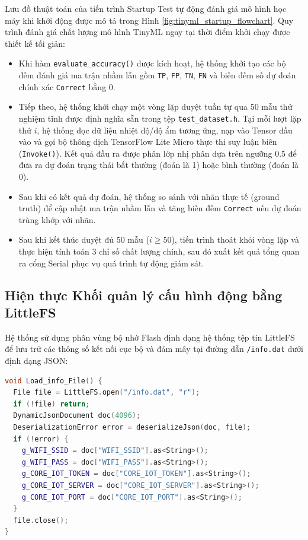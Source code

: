 Lưu đồ thuật toán của tiến trình Startup Test tự động đánh giá mô hình học máy khi khởi động được mô tả trong Hình \ref{fig:tinyml_startup_flowchart}. Quy trình đánh giá chất lượng mô hình TinyML ngay tại thời điểm khởi chạy được thiết kế tối giản:
\begin{itemize}
    \item Khi hàm \texttt{evaluate\_accuracy()} được kích hoạt, hệ thống khởi tạo các bộ đếm đánh giá ma trận nhầm lẫn gồm \texttt{TP}, \texttt{FP}, \texttt{TN}, \texttt{FN} và biến đếm số dự đoán chính xác \texttt{Correct} bằng 0.
    \item Tiếp theo, hệ thống khởi chạy một vòng lặp duyệt tuần tự qua 50 mẫu thử nghiệm tĩnh được định nghĩa sẵn trong tệp \texttt{test\_dataset.h}. Tại mỗi lượt lặp thứ $i$, hệ thống đọc dữ liệu nhiệt độ/độ ẩm tương ứng, nạp vào Tensor đầu vào và gọi bộ thông dịch TensorFlow Lite Micro thực thi suy luận biên (\texttt{Invoke()}). Kết quả đầu ra được phân lớp nhị phân dựa trên ngưỡng 0.5 để đưa ra dự đoán trạng thái bất thường (đoán là 1) hoặc bình thường (đoán là 0).
    \item Sau khi có kết quả dự đoán, hệ thống so sánh với nhãn thực tế (ground truth) để cập nhật ma trận nhầm lẫn và tăng biến đếm \texttt{Correct} nếu dự đoán trùng khớp với nhãn.
    \item Sau khi kết thúc duyệt đủ 50 mẫu ($i \ge 50$), tiến trình thoát khỏi vòng lặp và thực hiện tính toán 3 chỉ số chất lượng chính, sau đó xuất kết quả tổng quan ra cổng Serial phục vụ quá trình tự động giám sát.
\end{itemize}

\subsection{Hiện thực Khối quản lý cấu hình động bằng LittleFS}
Hệ thống sử dụng phân vùng bộ nhớ Flash định dạng hệ thống tệp tin LittleFS để lưu trữ các thông số kết nối cục bộ và đám mây tại đường dẫn \texttt{/info.dat} dưới định dạng JSON:
\begin{lstlisting}[language=C++]
void Load_info_File() {
  File file = LittleFS.open("/info.dat", "r");
  if (!file) return;
  DynamicJsonDocument doc(4096);
  DeserializationError error = deserializeJson(doc, file);
  if (!error) {
    g_WIFI_SSID = doc["WIFI_SSID"].as<String>();
    g_WIFI_PASS = doc["WIFI_PASS"].as<String>();
    g_CORE_IOT_TOKEN = doc["CORE_IOT_TOKEN"].as<String>();
    g_CORE_IOT_SERVER = doc["CORE_IOT_SERVER"].as<String>();
    g_CORE_IOT_PORT = doc["CORE_IOT_PORT"].as<String>();
  }
  file.close();
}
\end{lstlisting}


